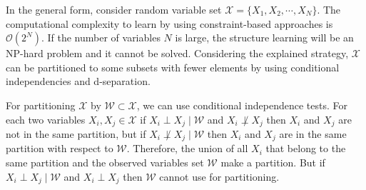 \documentclass{article}
\newcommand{\X}{\mathcal{X}}
\newcommand{\W}{\mathcal{W}}
\begin{document}
In the general form, consider random variable set $\X = \{X_1, X_2,\cdots, X_N \}$. The computational complexity to learn by using constraint-based  approaches is $\mathcal{O}(2^N)$.  If the number of variables $N$ is large, the structure learning will be an NP-hard problem and it cannot be solved. 
Considering the explained strategy, $\X$ can be partitioned to some subsets with fewer elements by using conditional independencies  and d-separation. 

For partitioning $\X$ by $\W \subset \X$, we can use conditional independence tests. For each two variables $X_i,X_j \in \X$ if $X_i\perp X_j \mid \W$ and $X_i\not\perp X_j$ then $X_i$ and $X_j$ are not in the same partition, but if $X_i\not \perp X_j \mid \W$ then $X_i$ and $X_j$ are in the same partition with respect to $\W$.
Therefore, the union of all $X_i$ that belong to the same partition and the observed variables set $\W$ make a partition. 
But if $X_i\perp X_j \mid \W$ and $X_i\perp X_j$ then $\W$ cannot use for partitioning.
\end{document}
